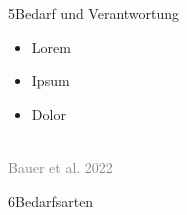 \documentclass[xcolor=table,9pt,aspectratio=169]{beamer}
\begin{document}
\begin{frame}{\vspace*{10mm}5\hspace*{1em}Bedarf und Verantwortung}
\begin{multicols}{2}
   \begin{itemize}
      \item Lorem
      \item Ipsum
      \item Dolor
   \end{itemize}
   \vfill
   \begin{center}
      \\
      \footnotesize{\textcolor{gray}{Bauer et al. 2022}}
   \end{center}
\end{multicols}
\end{frame}


\begin{frame}
\begin{overlayarea}{\textwidth}{0.81\paperheight}{
   \vspace*{11mm}
   \textcolor{uolblue}
   {6\hspace*{1em}Bedarfsarten}
}
\end{overlayarea}
\end{frame}
\end{document}
